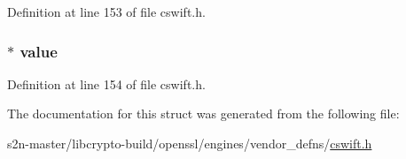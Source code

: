 Definition at line 153 of file cswift.\+h.

\subsubsection[{\texorpdfstring{value}{value}}]{$\ast$ value}\hypertarget{struct___s_w___l_a_r_g_e_n_u_m_b_e_r_af0e96cb5b025e781ddb9cac2cb052dc0}{}\label{struct___s_w___l_a_r_g_e_n_u_m_b_e_r_af0e96cb5b025e781ddb9cac2cb052dc0}


Definition at line 154 of file cswift.\+h.



The documentation for this struct was generated from the following file\+:\begin{DoxyCompactItemize}
\item 
s2n-\/master/libcrypto-\/build/openssl/engines/vendor\+\_\+defns/\hyperlink{cswift_8h}{cswift.\+h}\end{DoxyCompactItemize}
